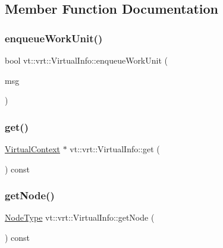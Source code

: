 \subsection{Member Function Documentation}
\mbox{\label{structvt_1_1vrt_1_1_virtual_info_a9e31b6696cfa2482c036f70bf7ae6285}} 
\subsubsection{\texorpdfstring{enqueue\+Work\+Unit()}{enqueueWorkUnit()}}
{\footnotesize\ttfamily bool vt\+::vrt\+::\+Virtual\+Info\+::enqueue\+Work\+Unit (\begin{DoxyParamCaption}\item[{\hyperlink{structvt_1_1vrt_1_1_virtual_message}{Virtual\+Message} $\ast$}]{msg }\end{DoxyParamCaption})}

\mbox{\label{structvt_1_1vrt_1_1_virtual_info_a7857993ff78f907fd2d95d5637cc9a87}} 
\subsubsection{\texorpdfstring{get()}{get()}}
{\footnotesize\ttfamily \hyperlink{structvt_1_1vrt_1_1_virtual_context}{Virtual\+Context} $\ast$ vt\+::vrt\+::\+Virtual\+Info\+::get (\begin{DoxyParamCaption}{ }\end{DoxyParamCaption}) const}

\mbox{\label{structvt_1_1vrt_1_1_virtual_info_aac6a0d894c563a3c347930e872541e1b}} 
\subsubsection{\texorpdfstring{get\+Node()}{getNode()}}
{\footnotesize\ttfamily \hyperlink{namespacevt_a866da9d0efc19c0a1ce79e9e492f47e2}{Node\+Type} vt\+::vrt\+::\+Virtual\+Info\+::get\+Node (\begin{DoxyParamCaption}{ }\end{DoxyParamCaption}) const\hspace{0.3cm}{\ttfamily [inline]}}

